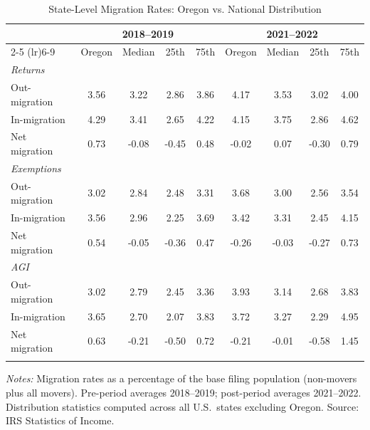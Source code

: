 \begin{table}[htbp]
\centering
\caption{State-Level Migration Rates: Oregon vs. National Distribution}
\label{tab:migration_state}
\begin{threeparttable}
\small
\begin{tabular}{lcccccccc}
\toprule
 & \multicolumn{4}{c}{2018--2019} & \multicolumn{4}{c}{2021--2022} \\
\cmidrule(lr){2-5} \cmidrule(lr){6-9}
 & Oregon & Median & 25th & 75th & Oregon & Median & 25th & 75th \\
\midrule
\textit{Returns} & & & & & & & & \\
\quad Out-migration &  3.56 &  3.22 &  2.86 &  3.86 &  4.17 &  3.53 &  3.02 &  4.00 \\
\quad In-migration &  4.29 &  3.41 &  2.65 &  4.22 &  4.15 &  3.75 &  2.86 &  4.62 \\
\quad Net migration &  0.73 & -0.08 & -0.45 &  0.48 & -0.02 &  0.07 & -0.30 &  0.79 \\
\addlinespace
\textit{Exemptions} & & & & & & & & \\
\quad Out-migration &  3.02 &  2.84 &  2.48 &  3.31 &  3.68 &  3.00 &  2.56 &  3.54 \\
\quad In-migration &  3.56 &  2.96 &  2.25 &  3.69 &  3.42 &  3.31 &  2.45 &  4.15 \\
\quad Net migration &  0.54 & -0.05 & -0.36 &  0.47 & -0.26 & -0.03 & -0.27 &  0.73 \\
\addlinespace
\textit{AGI} & & & & & & & & \\
\quad Out-migration &  3.02 &  2.79 &  2.45 &  3.36 &  3.93 &  3.14 &  2.68 &  3.83 \\
\quad In-migration &  3.65 &  2.70 &  2.07 &  3.83 &  3.72 &  3.27 &  2.29 &  4.95 \\
\quad Net migration &  0.63 & -0.21 & -0.50 &  0.72 & -0.21 & -0.01 & -0.58 &  1.45 \\
\addlinespace
\bottomrule
\end{tabular}
\begin{tablenotes}[flushleft]
\small
\item \textit{Notes:} Migration rates as a percentage of the base filing population (non-movers plus all movers). Pre-period averages 2018--2019; post-period averages 2021--2022. Distribution statistics computed across all U.S.\ states excluding Oregon. Source: IRS Statistics of Income.
\end{tablenotes}
\end{threeparttable}
\end{table}
